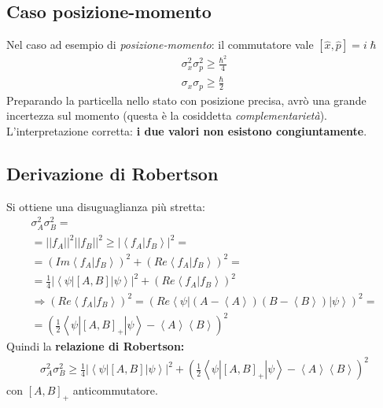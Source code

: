 \subsection{Caso posizione-momento} %
Nel caso ad esempio di \emph{posizione-momento}:
il commutatore vale $\left[\hat{x},\hat{p}\right] = i\hslash$
\begin{equation}\begin{split}
\sigma_x^2\sigma_p^2\ge \frac{\hbar ^2}{4} \\
\sigma_x\sigma_p \ge \frac{\hbar }{2}
\end{split}\end{equation}
Preparando la particella nello stato con posizione precisa, avrò una grande incertezza sul momento (questa è la cosiddetta \emph{complementarietà}).\\
L'interpretazione corretta: \textbf{i due valori non esistono congiuntamente}.

\subsection{Derivazione di Robertson} %
Si ottiene una disuguaglianza più stretta:
\begin{equation}\begin{split}
\sigma_A^2\sigma_B^2= \\
=||f_A||^2||f_B||^2\ge |\left\langle f_A|f_B \right\rangle |^2= \\
=\left(Im\left\langle f_A|f_B \right\rangle\right)^2+\left(Re\left\langle f_A|f_B \right\rangle\right)^2= \\
=\frac{1}{4}|\left\langle \psi |\left[A,B\right]|\psi  \right\rangle|^2+\left(Re\left\langle f_A|f_B \right\rangle\right)^2 \\
\Longrightarrow \left(Re\left\langle f_A|f_B \right\rangle\right)^2=\left(Re\left\langle \psi |\left(A-\left\langle A \right\rangle\right)\left(B-\left\langle B \right\rangle\right)|\psi  \right\rangle\right)^2= \\
=\left(\frac{1}{2}\left\langle \psi |\left[A,B\right]_+|\psi  \right\rangle-\left\langle A \right\rangle\left\langle B \right\rangle\right)^2
\end{split}\end{equation}
Quindi la \textbf{relazione di Robertson:}
\begin{equation}\begin{split}
\sigma_A^2\sigma_B^2\ge \frac{1}{4}|\left\langle \psi |\left[A,B\right]|\psi  \right\rangle|^2+\left(\frac{1}{2}\left\langle \psi |\left[A,B\right]_+|\psi  \right\rangle-\left\langle A \right\rangle\left\langle B \right\rangle\right)^2
\end{split}\end{equation}
con $\left[A,B\right]_+$ anticommutatore.

